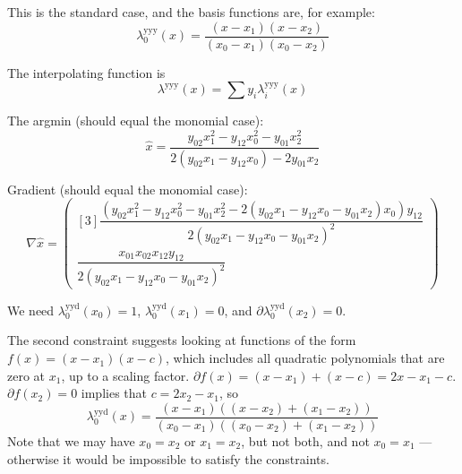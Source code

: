 
This is the standard case, and the basis functions are,
for example:
\begin{equation}
\lambda^{\text{yyy}}_0(x) = 
\frac {(x - x_1) (x - x_2)} {(x_0 - x_1) (x_0 - x_2)}
\end{equation}

The interpolating function is 
\begin{equation}
\lambda^{\text{yyy}}(x) = 
\sum y_i \lambda^{\text{yyy}}_i(x)
\end{equation}

The argmin (should equal the monomial case):
\begin{equation}
\hat{x} = 
\dfrac{y_{02} x_1^{2}-y_{12} x_0^{2}-y_{01} x_2^{2}
}{
2 \left(y_{02} x_1-y_{12} x_0\right)-2 y_{01} x_2
}
\end{equation}

Gradient (should equal the monomial case):
\begin{equation}
\nabla \hat{x} =
\begin{pmatrix}[3]
\dfrac{
\left(y_{02} x_1^{2}-y_{12} x_0^{2}-y_{01} x_2^{2}
-2 \left(y_{02} x_1-y_{12} x_0-y_{01} x_2\right) x_0\right) y_{12}
}{
2 \left(y_{02} x_1-y_{12} x_0-y_{01} x_2 \right)^{2}
}
\\
\dfrac{
x_{01} x_{02} x_{12} y_{12}
}{
2 \left(y_{02} x_1-y_{12} x_0-y_{01} x_2\right)^{2}
}
\end{pmatrix}
\end{equation}


We need 
$\lambda^{\text{yyd}}_0(x_0) = 1$, 
$\lambda^{\text{yyd}}_0(x_1) = 0$, and
$\partial\lambda^{\text{yyd}}_0(x_2) = 0$. 

The second constraint suggests looking at functions of the form
$f(x) = (x - x_1) (x - c)$, which includes all quadratic 
polynomials that are zero at $x_1$, up to a scaling factor.  
$\partial{f}(x) = (x - x_1) + (x - c) = 2 x - x_1 - c$.
$\partial{f}(x_2) = 0$ implies that
$c = 2 x_2 - x_1$,
so
\begin{equation}
\lambda^{\text{yyd}}_0(x) = 
\frac 
{(x - x_1) \left( (x - x_2) + (x_1 - x_2) \right)} 
{(x_0 - x_1) ((x_0 - x_2) + (x_1 - x_2))}
\end{equation}
Note that we may have $x_0 = x_2$ or $x_1 = x_2$, but not both,
and not $x_0 = x_1$ --- otherwise it would be impossible to 
satisfy the constraints.

